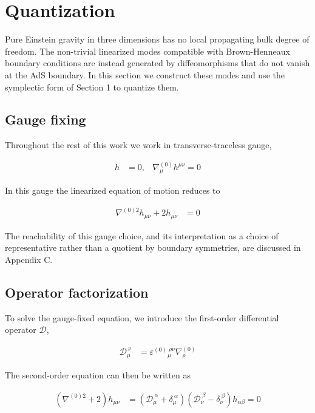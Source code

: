 \section{Quantization}\label{quantization}

Pure Einstein gravity in three dimensions has no local propagating bulk degree of freedom. The non-trivial linearized modes compatible with Brown-Henneaux boundary conditions are instead generated by diffeomorphisms that do not vanish at the AdS boundary. In this section we construct these modes and use the symplectic form of Section 1 to quantize them.

\subsection{Gauge fixing}\label{gauge-fixing}

Throughout the rest of this work we work in transverse-traceless gauge,

\begin{align}
h & =0, & \nabla _{\mu}^{(0)}h^{\mu \nu}=0
\end{align}

In this gauge the linearized equation of motion reduces to

\begin{align}
\nabla ^{(0)2}h_{\mu \nu}+2h_{\mu \nu} & =0
\end{align}

The reachability of this gauge choice, and its interpretation as a choice of representative rather than a quotient by boundary symmetries, are discussed in Appendix C.

\subsection{Operator factorization}\label{operator-factorization}

To solve the gauge-fixed equation, we introduce the first-order differential operator \(\mathcal{D}\),

\begin{align}
\mathcal{D}_{\mu}^{~\nu} & =\varepsilon^{(0)}{} _{\mu}^{~\rho \nu}\nabla _{\rho}^{(0)}
\end{align}

The second-order equation can then be written as

\begin{align}
(\nabla ^{(0)2}+2)h_{\mu \nu} & =(\mathcal{D}_{\mu}^{~\alpha}+\delta _{\mu}^{~\alpha})(\mathcal{D}_{\nu}^{~\beta}-\delta _{\nu}^{~\beta})h_{\alpha \beta}=0
\end{align}

